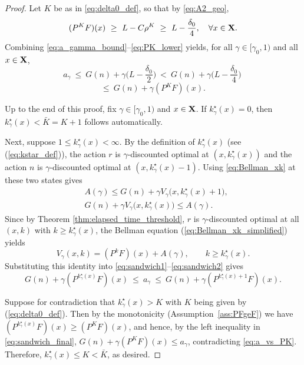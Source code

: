 \documentclass[letterpaper,10pt,conference]{ieeeconf}  %
\begin{document}
\begin{proof}
\medskip
Let $K$ be as in \eqref{eq:delta0_def}, so that by \eqref{eq:A2_geo},
\begin{equation}\label{eq:PK_lower}
(P^K F)(x)\ \ge\ L-C\rho^K\ \ge\ L-\frac{\delta_0}{4},
\quad \forall x\in {{\bf X}}.
\end{equation}
Combining \eqref{eq:a_gamma_bound}--\eqref{eq:PK_lower} yields, for all $\gamma\in[\gamma_0,1)$ and all $x\in {{\bf X}}$,
\[
a_\gamma\ \le\ G(n)+\gamma\Big(L-\frac{\delta_0}{2}\Big)
\ <\ G(n)+\gamma\Big(L-\frac{\delta_0}{4}\Big)\
\]
\begin{equation}\label{eq:a_vs_PK}
\le\ G(n)+\gamma(P^K F)(x).
\end{equation}

{Up to the end of this proof,} fix $\gamma\in[{\gamma_0},1)$ and $x\in {{\bf X}}$. If $k^\star_\gamma(x)=0$, then {$k^\star_\gamma(x)<\bar{K}=K+1$} follows {automatically}.

Next, suppose $1 \le k^\star_\gamma(x) < \infty$.
By the definition of $k^\star_\gamma(x)$ (see (\ref{eq:kstar_def})), {the} action $r$ is {$\gamma$-discounted} optimal at $(x,k^\star_\gamma(x))$ and {the} action $n$ is {$\gamma$-discounted} optimal at $(x,k^\star_\gamma(x)-1)$.
Using \eqref{eq:Bellman_xk} at these two states gives
\begin{align}
&{A(\gamma)} \le G(n)+\gamma V_\gamma\big(x,k^\star_\gamma(x)+1\big), \label{eq:sandwich1}\\
&G(n)+\gamma V_\gamma\big(x,k^\star_\gamma(x)\big) \le {A(\gamma)}. \label{eq:sandwich2}
\end{align}
Since {by Theorem \ref{thm:elapsed_time_threshold}}, $r$ is {$\gamma$-discounted} optimal at all $(x,k)$ with $k\ge k^\star_\gamma(x)$, the Bellman equation {(\ref{eq:Bellman_xk_simplified})} yields
\[
V_\gamma(x,k)=(P^kF)(x)+{A(\gamma)},\qquad k\ge k^\star_\gamma(x).
\]
Substituting this identity into \eqref{eq:sandwich1}--\eqref{eq:sandwich2} gives
\begin{equation}\label{eq:sandwich_final}
G(n)+\gamma(P^{k^\star_\gamma(x)}F)(x)\ \le\ a_\gamma\ \le\ G(n)+\gamma(P^{k^\star_\gamma(x)+1}F)(x).
\end{equation}

{Suppose for contradiction that} $k^\star_\gamma(x)> K$ {with $K$ being given by (\ref{eq:delta0_def})}. Then by the monotonicity (Assumption~\ref{ass:PFgeF}) we have
$(P^{k^\star_\gamma(x)}F)(x)\ge (P^K F)(x)$, and hence, {by the left inequality in \eqref{eq:sandwich_final},}
$G(n)+\gamma(P^K F)(x)\le a_\gamma$, contradicting \eqref{eq:a_vs_PK}.
Therefore, $k^\star_\gamma(x) \le K{<\bar{K}}$, as desired.


\end{proof}
\end{document}

